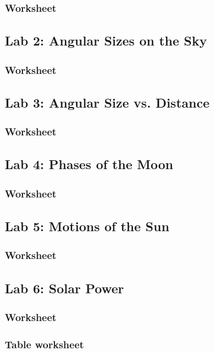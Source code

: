 \documentclass[12pt]{article}
\begin{document}
\subsubsection{Worksheet}


\subsection{Lab 2: Angular Sizes on the Sky}
\subsubsection{Worksheet}
%

\subsection{Lab 3: Angular Size vs. Distance}
\subsubsection{Worksheet}


\subsection{Lab 4: Phases of the Moon}
\subsubsection{Worksheet}


\subsection{Lab 5: Motions of the Sun}
\subsubsection{Worksheet}


\subsection{Lab 6: Solar Power}
\subsubsection{Worksheet}


\subsubsection{Table worksheet}
\end{document}

